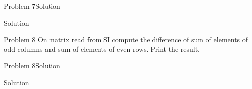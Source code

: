 \begin{frame}[fragile]{Problem 7}{Solution} 
\begin{exampleblock}{Solution}

\end{exampleblock}
\end{frame}

\begin{frame}{Problem 8}
On matrix read from SI compute the difference of sum of elements of odd
columns and sum of elements of even rows. Print the result.
\end{frame}

\begin{frame}[fragile]{Problem 8}{Solution} 
\begin{exampleblock}{Solution}

\end{exampleblock}
\end{frame}

\section{}


